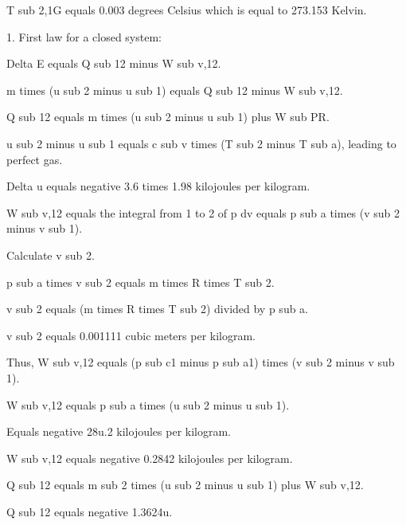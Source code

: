 T sub 2,1G equals 0.003 degrees Celsius which is equal to 273.153 Kelvin.

1. First law for a closed system:

Delta E equals Q sub 12 minus W sub v,12.

m times (u sub 2 minus u sub 1) equals Q sub 12 minus W sub v,12.

Q sub 12 equals m times (u sub 2 minus u sub 1) plus W sub PR.

u sub 2 minus u sub 1 equals c sub v times (T sub 2 minus T sub a), leading to perfect gas.

Delta u equals negative 3.6 times 1.98 kilojoules per kilogram.

W sub v,12 equals the integral from 1 to 2 of p dv equals p sub a times (v sub 2 minus v sub 1).

Calculate v sub 2.

p sub a times v sub 2 equals m times R times T sub 2.

v sub 2 equals (m times R times T sub 2) divided by p sub a.

v sub 2 equals 0.001111 cubic meters per kilogram.

Thus, W sub v,12 equals (p sub c1 minus p sub a1) times (v sub 2 minus v sub 1).

W sub v,12 equals p sub a times (u sub 2 minus u sub 1).

Equals negative 28u.2 kilojoules per kilogram.

W sub v,12 equals negative 0.2842 kilojoules per kilogram.

Q sub 12 equals m sub 2 times (u sub 2 minus u sub 1) plus W sub v,12.

Q sub 12 equals negative 1.3624u.